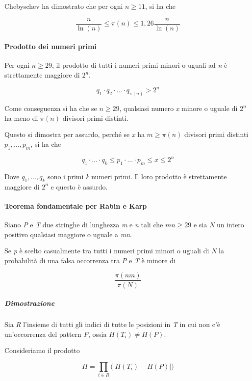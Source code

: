Chebyschev ha dimostrato che per ogni $n \geq 11$, si
ha che

$$
\frac{n}{\ln (n)} \leq \pi (n) \leq 1,26 \frac{n}{\ln (n)}
$$

\paragraph{Prodotto dei numeri primi}\label{prodotto-dei-numeri-primi}

Per ogni $n \geq  29$, il prodotto di tutti i numeri
primi minori o uguali ad \emph{n} è strettamente maggiore di
$2^{n}$.

$$
q_1 \cdot q_2 \cdot \ldots \cdot q_{\pi (n)} > 2^n
$$

Come conseguenza si ha che se $n \geq 29$, qualsiasi
numero \emph{x} minore o uguale di $2^n$ ha meno di $\pi(n)$
divisori primi distinti.

Questo si dimostra per assurdo, perché se \emph{x} ha $m \geq \pi(n)$ divisori primi distinti $p_1, \ldots , p_m$, si ha che

$$
q_1 \cdot \ldots \cdot q_k \leq p_1 \cdot \ldots \cdot p_m \leq x \leq 2^n
$$

Dove $q_1,\ldots , q_k$ sono i primi \emph{k} numeri primi. 
Il loro prodotto è strettamente maggiore di $2^n$ e questo è assurdo.

\paragraph{Teorema fondamentale per Rabin e Karp}\label{teorema-fondamentale-per-rabin-e-karp}

Siano \emph{P} e \emph{T} due stringhe di lunghezza \emph{m} e \emph{n}
tali che $mn \geq 29$ e sia \emph{N} un intero positivo
qualsiasi maggiore o uguale a \emph{mn}.

Se \emph{p} è scelto casualmente tra tutti i numeri primi minori o
uguali di \emph{N} la probabilità di una falsa occorrenza tra \emph{P} e
\emph{T} è minore di

$$
\frac{\pi (nm)}{\pi (N)}
$$

\subparagraph{Dimostrazione}\label{dimostrazione}

Sia \emph{R} l'insieme di tutti gli indici di tutte le posizioni in
\emph{T} in cui non c'è un'occorrenza del pattern \emph{P}, ossia
$H(T_i) \neq H(P)$.

Consideriamo il prodotto

$$
\Pi = \prod\limits_{i \in R} \big(\big|H(T_i) - H(P)\big|\big)
$$

